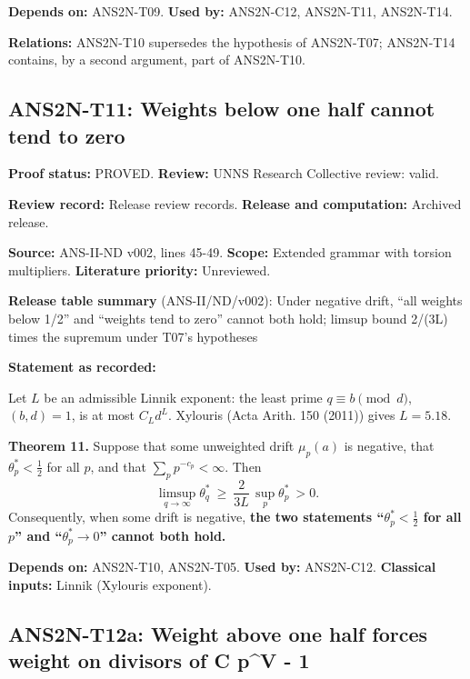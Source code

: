\documentclass[
  11pt,
]{article}
\begin{document}
\textbf{Depends on:} ANS2N-T09. \textbf{Used by:} ANS2N-C12, ANS2N-T11,
ANS2N-T14.

\textbf{Relations:} ANS2N-T10 supersedes the hypothesis of ANS2N-T07;
ANS2N-T14 contains, by a second argument, part of ANS2N-T10.

\hypertarget{ans2n-t11-weights-below-one-half-cannot-tend-to-zero}{%
\subsection{ANS2N-T11: Weights below one half cannot tend to
zero}\label{ans2n-t11-weights-below-one-half-cannot-tend-to-zero}}

\textbf{Proof status:} PROVED. \textbf{Review:} UNNS Research Collective
review: valid.

\textbf{Review record:} Release review records. \textbf{Release and
computation:} Archived release.

\textbf{Source:} ANS-II-ND v002, lines 45-49. \textbf{Scope:} Extended
grammar with torsion multipliers. \textbf{Literature priority:}
Unreviewed.

\textbf{Release table summary} (ANS-II/ND/v002): Under negative drift,
``all weights below 1/2'' and ``weights tend to zero'' cannot both hold;
limsup bound 2/(3L) times the supremum under T07's hypotheses

\textbf{Statement as recorded:}

Let \(L\) be an admissible Linnik exponent: the least prime
\(q\equiv b\pmod d\), \((b,d)=1\), is at most \(C_Ld^L\). Xylouris (Acta
Arith. 150 (2011)) gives \(L=5.18\).

\textbf{Theorem 11.} Suppose that some unweighted drift \(\mu_p(a)\) is
negative, that \(\theta^\ast_p<\frac12\) for all \(p\), and that
\(\sum_pp^{-c_p}<\infty\). Then
\[\limsup_{q\to\infty}\theta^\ast_q\ \ge\ \frac{2}{3L}\,\sup_p\theta^\ast_p\ >0 .\]
Consequently, when some drift is negative, \textbf{the two statements
``\(\theta^\ast_p<\frac12\) for all \(p\)'' and
``\(\theta^\ast_p\to0\)'' cannot both hold.}

\textbf{Depends on:} ANS2N-T10, ANS2N-T05. \textbf{Used by:} ANS2N-C12.
\textbf{Classical inputs:} Linnik (Xylouris exponent).

\hypertarget{ans2n-t12a-weight-above-one-half-forces-weight-on-divisors-of-c-pv---1}{%
\subsection{ANS2N-T12a: Weight above one half forces weight on divisors
of C p\^{}V -
1}\label{ans2n-t12a-weight-above-one-half-forces-weight-on-divisors-of-c-pv---1}}
\end{document}
